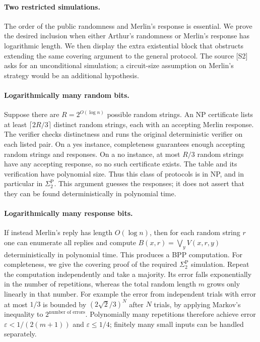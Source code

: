 \documentclass[11pt,a4paper]{article}
\begin{document}
\paragraph{Two restricted simulations.}
The order of the public randomness and Merlin's response
is essential. We prove the desired inclusion when either
Arthur's randomness or Merlin's response has logarithmic
length. We then display the extra existential block
that obstructs extending the same covering argument
to the general protocol. The source [S2] asks for an
unconditional simulation; a circuit-size assumption
on Merlin's strategy would be an additional hypothesis.

\paragraph{Logarithmically many random bits.}
Suppose there are $R=2^{O(\log n)}$ possible random
strings. An NP certificate lists at least
$\lceil2R/3\rceil$ distinct random strings, each with
an accepting Merlin response. The verifier checks
distinctness and runs the original deterministic
verifier on each listed pair. On a yes instance,
completeness guarantees enough accepting random
strings and responses. On a no instance, at most
$R/3$ random strings have any accepting response,
so no such certificate exists. The table and its
verification have polynomial size. Thus this class
of protocols is in NP, and in particular in
$\Sigma_2^{\mathrm P}$. This argument guesses the
responses; it does not assert that they can be
found deterministically in polynomial time.

\paragraph{Logarithmically many response bits.}
If instead Merlin's reply has length $O(\log n)$,
then for each random string $r$ one can enumerate
all replies and compute
$B(x,r)=\bigvee_y V(x,r,y)$ deterministically in
polynomial time. This produces a BPP computation.
For completeness, we give the covering proof of
the required $\Sigma_2^{\mathrm P}$ simulation.
Repeat the computation independently and take a
majority. Its error falls exponentially in the
number of repetitions, whereas the total random
length $m$ grows only linearly in that number.
For example the error from independent trials
with error at most $1/3$ is bounded by
$(2\sqrt2/3)^N$ after $N$ trials, by applying
Markov's inequality to $2^{\text{number of errors}}$.
Polynomially many repetitions therefore achieve
error $\varepsilon<1/(2(m+1))$ and
$\varepsilon\le1/4$; finitely many small inputs
can be handled separately.
\end{document}
